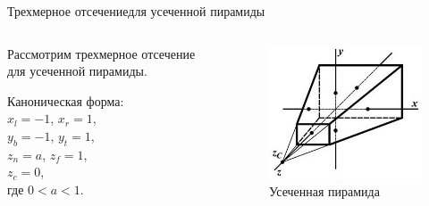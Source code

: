 \documentclass{beamer}
\begin{document}
	\begin{frame}{Трехмерное отсечение}{для усеченной пирамиды}

		\begin{columns}
			\begin{column}{0.5\textwidth}
				Рассмотрим трехмерное отсечение для усеченной пирамиды. 

			Каноническая форма: \\
			$x_l = -1$, $x_r = 1$, \\
			$y_b = -1$, $y_t = 1$, \\
			$z_n = a$, $z_f = 1$, \\
			$z_c = 0$,
			\\ где  $0<a<1$.
			\end{column}
			\begin{column}{0.5\textwidth}
		\begin{figure} 
			\includegraphics[width=\textwidth]{images/clipping_2.jpg}
			\caption {Усеченная пирамида}
		\end{figure}

		\end{column}
	\end{columns}


	\end{frame}
	
\end{document}
